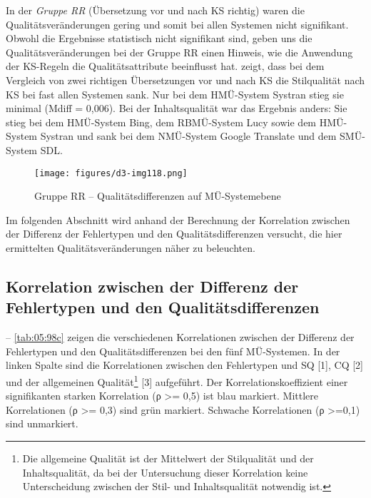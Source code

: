 In der \textit{Gruppe RR} (Übersetzung vor und nach KS richtig) waren die Qualitätsveränderungen gering und somit bei allen Systemen nicht signifikant. Obwohl die Ergebnisse statistisch nicht signifikant sind, geben uns die Qualitätsveränderungen bei der Gruppe RR einen Hinweis, wie die Anwendung der KS-Regeln die Qualitätsattribute beeinflusst hat.  zeigt, dass bei dem Vergleich von zwei richtigen Übersetzungen vor und nach KS die Stilqualität nach KS bei fast allen Systemen sank. Nur bei dem HMÜ-System Systran stieg sie minimal (Mdiff = 0,006). Bei der Inhaltsqualität war das Ergebnis anders: Sie stieg bei dem HMÜ-System Bing, dem RBMÜ-System Lucy sowie dem HMÜ-System Systran und sank bei dem NMÜ-System Google Translate und dem SMÜ-System SDL.


\begin{figure}
\texttt{[image: figures/d3-img118.png]}

\caption{\label{fig:05:146}Gruppe RR -- Qualitätsdifferenzen auf MÜ-Systemebene   }
\end{figure}

Im folgenden Abschnitt wird anhand der Berechnung der Korrelation zwischen der Differenz der Fehlertypen und den Qualitätsdifferenzen versucht, die hier ermittelten Qualitätsveränderungen näher zu beleuchten.

\subsection{Korrelation zwischen der Differenz der Fehlertypen und den Qualitätsdifferenzen}
\label{sec:5.4.7}

 -- \ref{tab:05:98c} zeigen die verschiedenen Korrelationen zwischen der Differenz der Fehlertypen und den Qualitätsdifferenzen bei den fünf MÜ-Systemen. In der linken Spalte sind die Korrelationen zwischen den Fehlertypen und SQ [1], CQ [2] und der allgemeinen Qualität\footnote{\textrm{Die allgemeine Qualität ist der Mittelwert der Stilqualität und der Inhaltsqualität, da bei der Untersuchung dieser Korrelation keine Unterscheidung zwischen der Stil- und Inhaltsqualität notwendig ist.}} [3] aufgeführt. Der Korrelationskoeffizient einer signifikanten starken Korrelation (ρ >= 0,5) ist blau markiert. Mittlere Korrelationen (ρ >= 0,3) sind grün markiert. Schwache Korrelationen (ρ >=0,1) sind unmarkiert.


